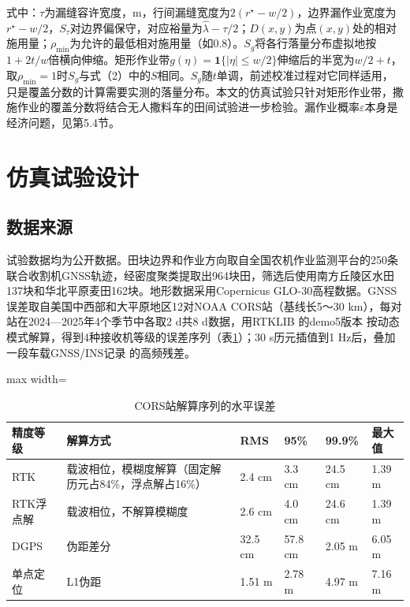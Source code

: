 \documentclass[preprint,12pt,number,sort&compress]{elsarticle}
\begin{document}
式中：\(\tau\)为漏缝容许宽度，m，行间漏缝宽度为\(2(r^\star-w/2)\)，边界漏作业宽度为\(r^\star-w/2\)，\(S_\tau\)对边界偏保守，对应裕量为\(\hat\lambda-\tau/2\)；\(D(x,y)\)为点\((x,y)\)处的相对施用量；\(\rho_\mathrm{min}\)为允许的最低相对施用量（如0.8）。\(S_g\)将各行落量分布虚拟地按\(1+2t/w\)倍横向伸缩。矩形作业带\(g(\eta)=\mathbf 1\{|\eta|\le w/2\}\)伸缩后的半宽为\(w/2+t\)，取\(\rho_\mathrm{min}=1\)时\(S_g\)与式（2）中的\(S\)相同。\(S_g\)随\(t\)单调，前述校准过程对它同样适用，只是覆盖分数的计算需要实测的落量分布。本文的仿真试验只针对矩形作业带，撒施作业的覆盖分数将结合无人撒料车的田间试验进一步检验。漏作业概率\(\varepsilon\)本身是经济问题，见第5.4节。

\section{仿真试验设计}

\subsection{数据来源}

试验数据均为公开数据。田块边界和作业方向取自全国农机作业监测平台的250条联合收割机GNSS轨迹\citep{wu2023}，经密度聚类提取出964块田，筛选后使用南方丘陵区水田137块和华北平原麦田162块。地形数据采用Copernicus GLO-30高程数据\citep{esa2021}。GNSS误差取自美国中西部和大平原地区12对NOAA CORS站（基线长5～30 km），每对站在2024---2025年4个季节中各取2 d共8 d数据，用RTKLIB\citep{takasu2009} 的demo5版本\citep{everett_demo5} 按动态模式解算，得到4种接收机等级的误差序列（表\ref{tab:2}）；30 s历元插值到1 Hz后，叠加一段车载GNSS/INS记录\citep{tang2022} 的高频残差。

\begin{table}[H]
\centering
\footnotesize
\caption{CORS站解算序列的水平误差}\label{tab:2}
\begin{adjustbox}{max width=\textwidth}
\begin{tabular}{@{}l>{\raggedright\arraybackslash}p{20.8em}llll@{}}
\toprule
\textbf{精度等级} & \textbf{解算方式} & \textbf{RMS} & \textbf{95\%} & \textbf{99.9\%} & \textbf{最大值} \\
\midrule
RTK & 载波相位，模糊度解算（固定解历元占84\%，浮点解占16\%） & 2.4 cm & 3.3 cm & 24.5 cm & 1.39 m \\
RTK浮点解 & 载波相位，不解算模糊度 & 2.6 cm & 4.0 cm & 24.6 cm & 1.39 m \\
DGPS & 伪距差分 & 32.5 cm & 57.8 cm & 2.05 m & 6.05 m \\
单点定位 & L1伪距 & 1.51 m & 2.78 m & 4.97 m & 7.16 m \\
\bottomrule
\end{tabular}
\end{adjustbox}
\end{table}
\end{document}
